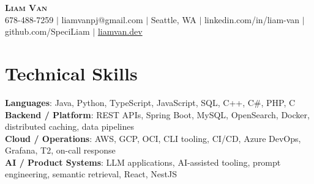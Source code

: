 \documentclass[letterpaper,11pt]{article}
\begin{document}

%
\begin{center}
    \textbf{\Huge \scshape Liam Van} \\ \vspace{1pt}
    \small 678-488-7259 $|$ \small {liamvanpj@gmail.com} $|$ Seattle, WA
 {{$|$ linkedin.com/in/liam-van} {$|$ github.com/SpeciLiam} {$|$ \href{https://liamvan.dev}{liamvan.dev}}}

\end{center}

\section{Technical Skills}
 \begin{itemize}[leftmargin=0.15in, label={}]
    \small{\item{
     \textbf{Languages}{: Java, Python, TypeScript, JavaScript, SQL, C++, C\#, PHP, C} \\
     \textbf{Backend / Platform}{: REST APIs, Spring Boot, MySQL, OpenSearch, Docker, distributed caching, data pipelines} \\
     \textbf{Cloud / Operations}{: AWS, GCP, OCI, CLI tooling, CI/CD, Azure DevOps, Grafana, T2, on-call response} \\
     \textbf{AI / Product Systems}{: LLM applications, AI-assisted tooling, prompt engineering, semantic retrieval, React, NestJS} \\
    }}
 \end{itemize}
%

\end{document}
